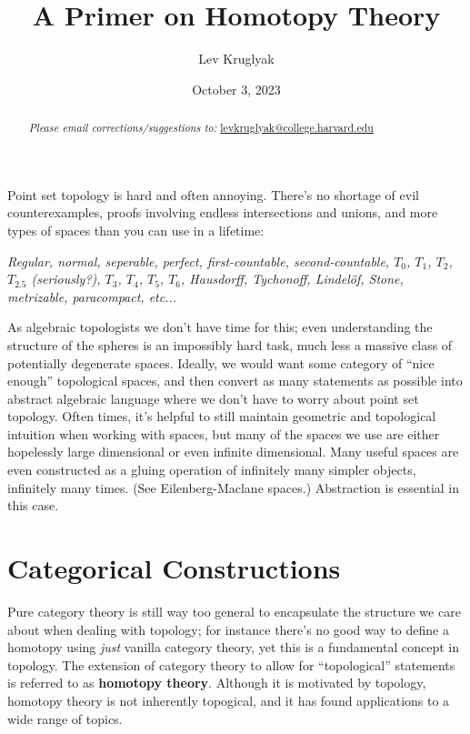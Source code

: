\documentclass[12pt]{article}
\title{\textbf{A Primer on Homotopy Theory}}
\date{October 3, 2023}
\author{Lev Kruglyak}
\begin{document}
\maketitle
\begin{abstract}

    \medskip
    \begin{center}
        \emph{Please email corrections/suggestions to:} \underline{levkruglyak@college.harvard.edu}
    \end{center}
\end{abstract}
\tableofcontents
\medskip

Point set topology is hard and often annoying. There's no shortage of evil counterexamples, proofs involving endless intersections and unions, and more types of spaces than you can use in a lifetime:

\begin{center}
  \emph{Regular, normal, seperable, perfect, first-countable, second-countable, $T_0$, $T_1$, $T_2$, $T_{2.5}$ (seriously?), $T_3$, $T_4$, $T_5$, $T_6$, Hausdorff, Tychonoff, Lindel\"of, Stone, metrizable, paracompact, etc...}
\end{center}

As algebraic topologists we don't have time for this; even understanding the structure of the spheres is an impossibly hard task, much less a massive class of potentially degenerate spaces. Ideally, we would want some category of ``nice enough'' topological spaces, and then convert as many statements as possible into abstract algebraic language where we don't have to worry about point set topology.
Often times, it's helpful to still maintain geometric and topological intuition when working with spaces, but many of the spaces we use are either hopelessly large dimensional or even infinite dimensional. Many useful spaces are even constructed as a gluing operation of infinitely many simpler objects, infinitely many times. (See Eilenberg-Maclane spaces.) Abstraction is essential in this case.

\section{Categorical Constructions}

Pure category theory is still way too general to encapsulate the structure we care about when dealing with topology; for instance there's no good way to define a homotopy using \emph{just} vanilla category theory, yet this is a fundamental concept in topology. The extension of category theory to allow for ``topological'' statements is referred to as \textbf{homotopy theory}. Although it is motivated by topology, homotopy theory is not inherently topogical, and it has found applications to a wide range of topics. 
\end{document}
